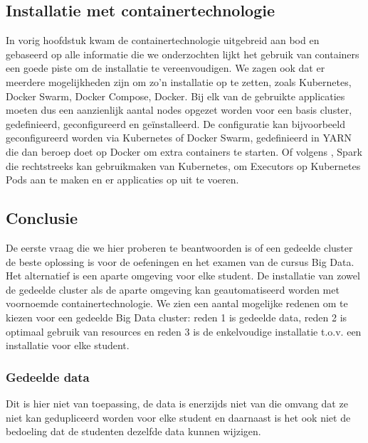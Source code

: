 \subsection{Installatie met containertechnologie}
In vorig hoofdstuk kwam de containertechnologie uitgebreid aan bod en gebaseerd op alle informatie die we onderzochten lijkt het gebruik van containers een goede piste om de installatie te vereenvoudigen.
\newline
We zagen ook dat er meerdere mogelijkheden zijn om zo'n installatie op te zetten, zoals Kubernetes, Docker Swarm, Docker Compose, Docker.
\newline
Bij elk van de gebruikte applicaties moeten dus een aanzienlijk aantal nodes opgezet worden voor een basis cluster, gedefinieerd, geconfigureerd en geïnstalleerd.
\newline
De configuratie kan bijvoorbeeld geconfigureerd worden via Kubernetes of Docker Swarm, gedefinieerd in YARN die dan beroep doet op Docker om extra containers te starten. Of volgens \textcite{Spark2023d}, Spark die rechtstreeks kan gebruikmaken van Kubernetes, om Executors op Kubernetes Pods aan te maken en er applicaties op uit te voeren.
\newline
\newline

\subsection{Conclusie}
De eerste vraag die we hier proberen te beantwoorden is of een gedeelde cluster de beste oplossing is voor de oefeningen en het examen van de cursus Big Data. Het alternatief is een aparte omgeving voor elke student.
\newline
De installatie van zowel de gedeelde cluster als de aparte omgeving kan geautomatiseerd worden met voornoemde containertechnologie.
\newline
We zien een aantal mogelijke redenen om te kiezen voor een gedeelde Big Data cluster: reden 1 is gedeelde data, reden 2 is optimaal gebruik van resources en reden 3 is de enkelvoudige installatie t.o.v. een installatie voor elke student.

\subsubsection{Gedeelde data}
Dit is hier niet van toepassing, de data is enerzijds niet van die omvang dat ze niet kan gedupliceerd worden voor elke student en daarnaast is het ook niet de bedoeling dat de studenten dezelfde data kunnen wijzigen.

